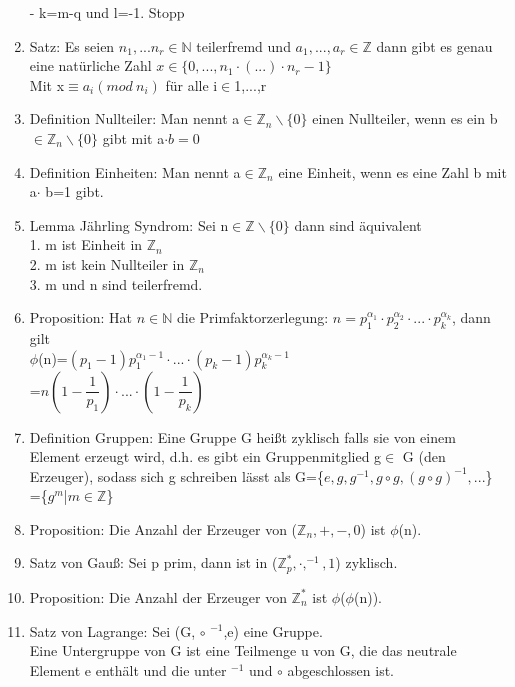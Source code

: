 \documentclass{scrartcl}
\begin{document}
\begin{enumerate}
    \hspace*{75pt}- k=m-q und l=-1. Stopp
    \item Satz: Es seien $n_1,...n_r\in \mathbb{N}$ teilerfremd und $a_1,...,a_r\in\mathbb{Z}$ dann gibt es genau eine natürliche Zahl $x\in\{0,...,n_1\cdot(...)\cdot n_r-1 \}$\\
    Mit x$\equiv a_i(mod~n_i)$ für alle i$\in${1,...,r}
    \item Definition Nullteiler: Man nennt a$\in \mathbb{Z}_n\backslash\{0\}$ einen Nullteiler, wenn es ein b$\in \mathbb{Z}_n\backslash\{0\}$ gibt mit a$\cdot b=0$
    \item Definition Einheiten: Man nennt a$\in \mathbb{Z}_n$ eine Einheit, wenn es eine Zahl b mit a$\cdot$ b=1 gibt.
    \item Lemma Jährling Syndrom: Sei n$\in \mathbb{Z}\backslash\{0\}$ dann sind äquivalent\\
    1. m ist Einheit in $\mathbb{Z}_n$\\
    2. m ist kein Nullteiler in $\mathbb{Z}_n$\\
    3. m und n sind teilerfremd.
    \item Proposition: Hat $n\in \mathbb{N}$ die Primfaktorzerlegung:
    $n=p_{1}^{\alpha_1}\cdot p_{2}^{\alpha_2}\cdot ...\cdot p_{k}^{\alpha_k}$, dann gilt\\ $\phi$(n)=$(p_1-1)p_{1}^{\alpha_1-1}\cdot ... \cdot (p_k-1)p_{k}^{\alpha_k-1}$\\=$n(1-\dfrac{1}{p_1})\cdot ... \cdot(1-\dfrac{1}{p_k})$
    \item Definition Gruppen: Eine Gruppe G heißt zyklisch falls sie von einem Element erzeugt wird, d.h. es gibt ein Gruppenmitglied g$\in$ G (den Erzeuger), sodass sich g schreiben lässt als G=\{$e,g,g^{-1},g\circ g,(g\circ g)^{-1},...$\}\\
    =\{$g^m$|$m\in\mathbb{Z}$\}
    \item Proposition: Die Anzahl der Erzeuger von ($\mathbb{Z}_n,+,-,0$) ist $\phi$(n).
    \item Satz von Gauß: Sei p prim, dann ist in ($\mathbb{Z}_{p}^{*},\cdot, ^{-1}, 1$) zyklisch.
    \item Proposition: Die Anzahl der Erzeuger von $\mathbb{Z}_{n}^{*}$ ist $\phi$($\phi$(n)).
    \item Satz von Lagrange: Sei (G, $\circ$ $^{-1}$,e) eine Gruppe.\\
    Eine Untergruppe von G ist eine Teilmenge u von G, die das neutrale Element e enthält und die unter $^{-1}$ und $\circ$ abgeschlossen ist.\\

\end{enumerate}
\end{document}
